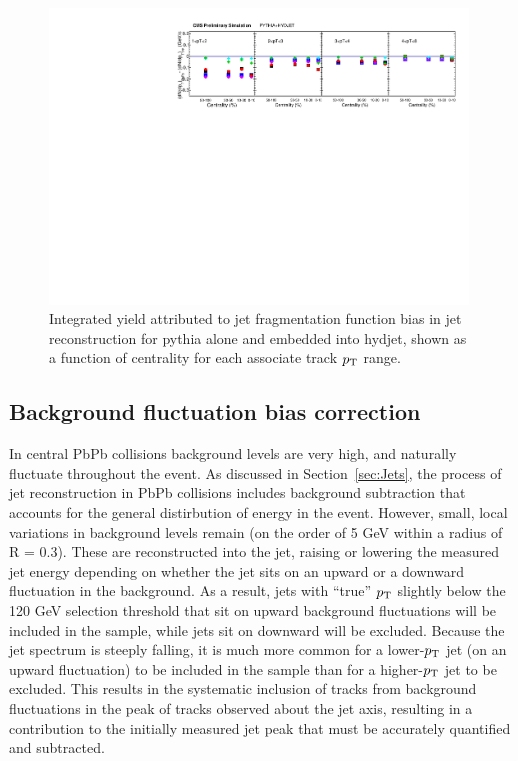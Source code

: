            
                  \begin{figure}[h!]
                  \begin{center}\includegraphics[width=0.99\textwidth]{figures/JFF_SpillOver/Integral_JFFResidual_Cent.pdf}
                  \caption[Integrated yield attributed to jet fragmentation function bias as a function of centrality]{Integrated yield attributed to jet fragmentation function bias in jet reconstruction for {\sc pythia} alone and embedded into {\sc hydjet}, shown as a function of centrality for each associate track $p_{\rm T}$ range.}
                    \label{fig:jff_residual_integrals_Cent}
                    \end{center}
                    \end{figure}
                    
\clearpage




\subsection{Background fluctuation bias correction}

In central PbPb collisions background levels are very high, and naturally fluctuate throughout the event.  As discussed in Section~\ref{sec:Jets}, the process of jet reconstruction in PbPb collisions includes background subtraction that accounts for the general distirbution of energy in the event.  However, small, local variations in background levels remain (on the order of 5 GeV within a radius of R = 0.3).  These are reconstructed into the jet, raising or lowering the measured jet energy depending on whether the jet sits on an upward or a downward fluctuation in the background.  As a result, jets with ``true'' $p_{\rm T}$ slightly below the 120 GeV selection threshold that sit on upward background fluctuations will be included in the sample, while jets sit on downward will be excluded.  Because the jet spectrum is steeply falling, it is much more common for a lower-$p_{\rm T}$ jet (on an upward fluctuation) to be included in the sample than for a higher-$p_{\rm T}$ jet to be excluded.  This results in the systematic inclusion of tracks from background fluctuations in the peak of tracks observed about the jet axis, resulting in a contribution to the initially measured jet peak that must be accurately quantified and subtracted.  

